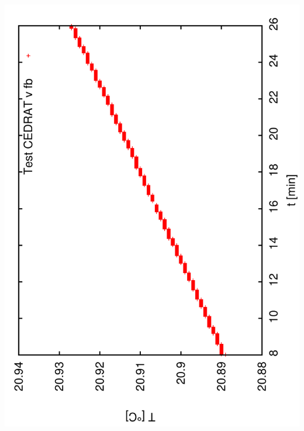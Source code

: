\documentclass[a4paper,11pt]{book}
\begin{document}
\includegraphics[angle=-90,scale=0.15]{image21a.pdf}\par
\end{document}
